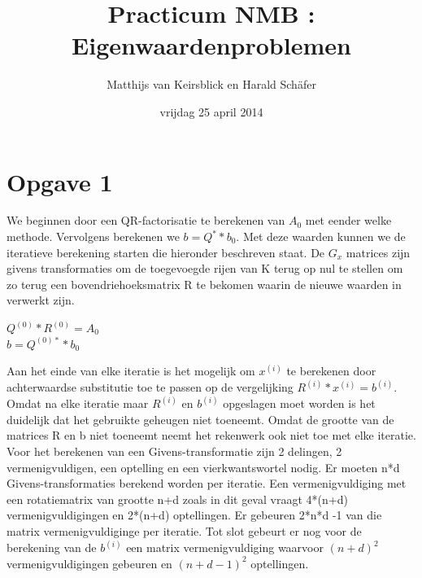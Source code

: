 \documentclass[]{article}
\title{Practicum NMB : Eigenwaardenproblemen}
\author{Matthijs van Keirsblick en Harald Sch\"{a}fer}
\date{vrijdag 25 april 2014}
\newcommand{\opgave}[1]{\pagebreak\section*{Opgave #1}}
\begin{document}
\maketitle
\opgave{1}

We beginnen door een QR-factorisatie te berekenen van $A_{0}$ met eender welke methode. Vervolgens berekenen we $b = Q^{*}*b_{0}$. Met deze waarden kunnen we de iteratieve berekening starten die hieronder beschreven staat. De $G_{x}$ matrices zijn givens transformaties om de toegevoegde rijen van K terug op nul te stellen om zo terug een bovendriehoeksmatrix R te bekomen waarin de nieuwe waarden in verwerkt zijn.

\begin{framed}
\begin{algorithm}[H] 
 $Q^{(0)}*R^{(0)} = A_{0}$\\
 $b = Q^{(0)*}*b_{0}$\\
 
\end{algorithm}
\end{framed}

Aan het einde van elke iteratie is het mogelijk om $x^{(i)}$ te berekenen door achterwaardse substitutie toe te passen op de vergelijking $R^{(i)}*x^{(i)} = b^{(i)}$. Omdat na elke iteratie maar $R^{(i)}$ en  $b^{(i)}$ opgeslagen moet worden is het duidelijk dat het gebruikte geheugen niet toeneemt. Omdat de grootte van de matrices R en b niet toeneemt neemt het rekenwerk ook niet toe met elke iteratie. Voor het berekenen van een Givens-transformatie zijn 2 delingen, 2 vermenigvuldigen, een optelling en een vierkwantswortel nodig. Er moeten n*d Givens-transformaties berekend worden per iteratie. Een vermenigvuldiging met een rotatiematrix van grootte n+d zoals in dit geval vraagt 4*(n+d) vermenigvuldigingen en 2*(n+d) optellingen. Er gebeuren 2*n*d -1 van die matrix vermenigvuldiginge per iteratie. Tot slot  gebeurt er nog voor de berekening van de $b^{(i)}$ een matrix vermenigvuldiging waarvoor $(n+d)^2$ vermenigvuldigingen gebeuren en $(n+d-1)^2$ optellingen.
\end{document}
